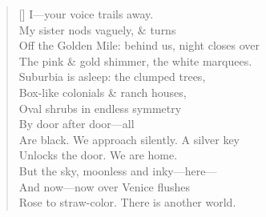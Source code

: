 \begin{verse}[\versewidth]
I---your voice trails away.\\
My sister nods vaguely, \& turns\\
Off the Golden Mile: behind us, night closes over\\
The pink \& gold shimmer, the white marquees.\\
Suburbia is asleep: the clumped trees,\\
Box-like colonials \& ranch houses,\\
Oval shrubs in endless symmetry\\
By door after door---all\\
Are black. We approach silently. A silver key\\
Unlocks the door.  We are home.\\
But the sky, moonless and inky---here---\\
And now---now over Venice flushes\\
Rose to straw-color. There is another world.
\end{verse}
